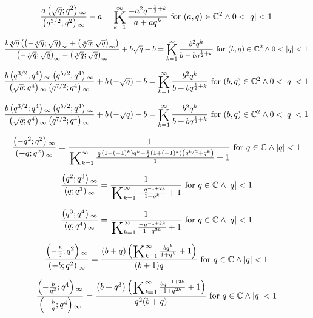 \documentclass{article}
\newcommand{\bigK}{\mathop{\raisebox{-5pt}{\huge K}}}
\begin{document}
\[\frac{a \left(\sqrt{q};q^2\right){}_{\infty }}{\left(q^{3/2};q^2\right){}_{\infty }}-a=\bigK_{k=1}^{\infty}\frac{-a^2 q^{-\frac{1}{2}+k}}{a+a q^k}\text{ for }(a,q)\in \mathbb{C}^2\land 0<\left| q\right| <1\] 

\[\frac{b \sqrt[4]{q} \left(\left(-\sqrt[4]{q};\sqrt{q}\right)_{\infty }+\left(\sqrt[4]{q};\sqrt{q}\right)_{\infty }\right)}{\left(-\sqrt[4]{q};\sqrt{q}\right)_{\infty }-\left(\sqrt[4]{q};\sqrt{q}\right)_{\infty }}+b \sqrt{q}-b=\bigK_{k=1}^{\infty}\frac{b^2 q^k}{b-b q^{\frac{1}{2}+k}}\text{ for }(b,q)\in \mathbb{C}^2\land 0<\left| q\right| <1\] 

\[\frac{b \left(q^{3/2};q^4\right){}_{\infty } \left(q^{5/2};q^4\right){}_{\infty }}{\left(\sqrt{q};q^4\right){}_{\infty } \left(q^{7/2};q^4\right){}_{\infty }}+b \left(-\sqrt{q}\right)-b=\bigK_{k=1}^{\infty}\frac{b^2 q^k}{b+b q^{\frac{1}{2}+k}}\text{ for }(b,q)\in \mathbb{C}^2\land 0<\left| q\right| <1\] 

\[\frac{b \left(q^{3/2};q^4\right){}_{\infty } \left(q^{5/2};q^4\right){}_{\infty }}{\left(\sqrt{q};q^4\right){}_{\infty } \left(q^{7/2};q^4\right){}_{\infty }}+b \left(-\sqrt{q}\right)-b=\bigK_{k=1}^{\infty}\frac{b^2 q^k}{b+b q^{\frac{1}{2}+k}}\text{ for }(b,q)\in \mathbb{C}^2\land 0<\left| q\right| <1\] 

\[\frac{\left(-q^2;q^2\right){}_{\infty }}{\left(-q;q^2\right){}_{\infty }}=\frac{1}{\bigK_{k=1}^{\infty}\frac{\frac{1}{2} \left(1-(-1)^k\right) q^k+\frac{1}{2} \left(1+(-1)^k\right) \left(q^{k/2}+q^k\right)}{1}+1}\text{ for }q\in \mathbb{C}\land \left| q\right| <1\] 

\[\frac{\left(q^2;q^3\right){}_{\infty }}{\left(q;q^3\right){}_{\infty }}=\frac{1}{\bigK_{k=1}^{\infty}\frac{-q^{-1+2 k}}{1+q^k}+1}\text{ for }q\in \mathbb{C}\land \left| q\right| <1\] 

\[\frac{\left(q^3;q^4\right){}_{\infty }}{\left(q;q^4\right){}_{\infty }}=\frac{1}{\bigK_{k=1}^{\infty}\frac{-q^{-1+2 k}}{1+q^{2 k}}+1}\text{ for }q\in \mathbb{C}\land \left| q\right| <1\] 

\[\frac{\left(-\frac{b}{q};q^2\right){}_{\infty }}{\left(-b;q^2\right){}_{\infty }}=\frac{(b+q) \left(\bigK_{k=1}^{\infty}\frac{b q^k}{1+q^k}+1\right)}{(b+1) q}\text{ for }q\in \mathbb{C}\land \left| q\right| <1\] 

\[\frac{\left(-\frac{b}{q^3};q^4\right){}_{\infty }}{\left(-\frac{b}{q};q^4\right){}_{\infty }}=\frac{\left(b+q^3\right) \left(\bigK_{k=1}^{\infty}\frac{b q^{-1+2 k}}{1+q^{2 k}}+1\right)}{q^2 (b+q)}\text{ for }q\in \mathbb{C}\land \left| q\right| <1\] 
\end{document}
